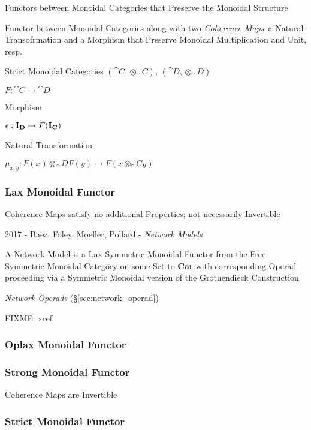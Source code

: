 Functors between Monoidal Categories that Preserve the Monoidal
Structure

Functor between Monoidal Categories along with two \emph{Coherence
  Maps}--a Natural Transofrmation and a Morphism that Preserve
Monoidal Multiplication and Unit, resp.

Strict Monoidal Categories $(\cat{C},\otimes_\cat{C})$,
$(\cat{D},\otimes_\cat{D})$

$F : \cat{C} \rightarrow \cat{D}$

Morphism

$\epsilon : \mathbf{I}_\mathbf{D} \rightarrow F(\mathbf{I}_\mathbf{C})$

Natural Transformation

$\mu_{x,y} : F(x) \otimes_\cat{D} F(y) \rightarrow F(x \otimes_\cat{C} y)$



\subsubsection{Lax Monoidal Functor}\label{sec:lax_monoidal_functor}

Coherence Maps satisfy no additional Properties; not necessarily
Invertible

2017 - Baez, Foley, Moeller, Pollard - \emph{Network Models}

A Network Model is a Lax Symmetric Monoidal Functor from the Free Symmetric
Monoidal Category on some Set to $\mathbf{Cat}$ with corresponding Operad
proceeding via a Symmetric Monoidal version of the Grothendieck Construction

\emph{Network Operads} (\S\ref{sec:network_operad})

FIXME: xref



\subsubsection{Oplax Monoidal Functor}\label{sec:oplax_monoidal_functor}

\subsubsection{Strong Monoidal Functor}\label{sec:strong_monoidal_functor}

Coherence Maps are Invertible



\subsubsection{Strict Monoidal Functor}\label{sec:strict_monoidal_functor}

